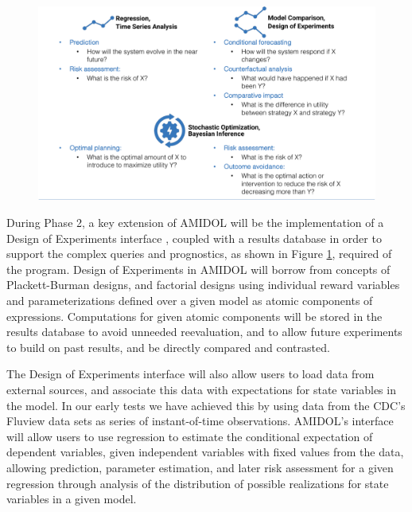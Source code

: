 \documentclass[11pt]{article}
\newcommand{\amidol}{\textsc{AMIDOL}}
\begin{document}
\begin{figure}
  \includegraphics[width=\textwidth]{figs/table.pdf}
  \caption{}
  \label{Fig:InferenceClasses}
\end{figure}

During Phase 2, a key extension of \amidol{} will be the implementation of a Design of Experiments interface \cite{montgomery2017design}, coupled with a results database in order to support the complex queries and prognostics, as shown in Figure \ref{Fig:InferenceClasses}, required of the program.  Design of Experiments in \amidol{} will borrow from concepts of Plackett-Burman designs, and factorial designs using individual reward variables and parameterizations defined over a given model as atomic components of expressions.  Computations for given atomic components will be stored in the results database to avoid unneeded reevaluation, and to allow future experiments to build on past results, and be directly compared and contrasted.

The Design of Experiments interface will also allow users to load data from external sources, and associate this data with expectations for state variables in the model.  In our early tests we have achieved this by using data from the CDC's Fluview \cite{cdc2019fluview} data sets as series of instant-of-time observations.  \amidol{}'s interface will allow users to use regression to estimate the conditional expectation of dependent variables, given independent variables with fixed values from the data, allowing prediction, parameter estimation, and later risk assessment for a given regression through analysis of the distribution of possible realizations for state variables in a given model.
\end{document}
